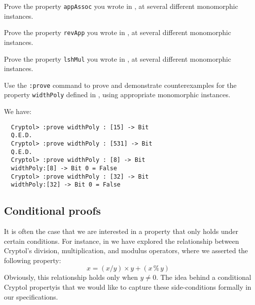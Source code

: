 \begin{Exercise}\label{ex:prove:2}
  Prove the property {\tt appAssoc} you wrote in
  , at several
  different monomorphic instances.
\end{Exercise}

\begin{Exercise}\label{ex:prove:3}
  Prove the property {\tt revApp} you wrote in
  , at several
  different monomorphic instances.
\end{Exercise}

\begin{Exercise}\label{ex:prove:4}
  Prove the property {\tt lshMul} you wrote in
  , at several
  different monomorphic instances.
\end{Exercise}

\begin{Exercise}\label{ex:prove:5}
  Use the {\tt :prove} command to prove and demonstrate
  counterexamples for the property {\tt widthPoly} defined in
  , using
  appropriate monomorphic instances.
\end{Exercise}
\begin{Answer}
We have:
\begin{Verbatim}
  Cryptol> :prove widthPoly : [15] -> Bit
  Q.E.D.
  Cryptol> :prove widthPoly : [531] -> Bit
  Q.E.D.
  Cryptol> :prove widthPoly : [8] -> Bit
  widthPoly:[8] -> Bit 0 = False
  Cryptol> :prove widthPoly : [32] -> Bit
  widthPoly:[32] -> Bit 0 = False
\end{Verbatim}
\end{Answer}

\subsection{Conditional proofs}
\label{sec:condproof}

It is often the case that we are interested in a property that only
holds under certain conditions.  For instance, in
 we have explored the
relationship between Cryptol's division, multiplication, and modulus
operators, where we asserted the following
property:\indMod\indDiv\indTimes
$$
  x = (x / y) \times y + (x\,\%\,y)
$$
Obviously, this relationship holds only when $y \not= 0$. The idea
behind a conditional Cryptol property\indThmCond is that we would like
to capture these side-conditions formally in our specifications.

